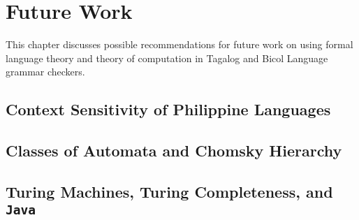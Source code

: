 \chapter{Future Work}

This chapter discusses possible recommendations for future work on using formal language theory and theory of computation in Tagalog and Bicol Language grammar checkers.

\section{Context Sensitivity of Philippine Languages}

\section{Classes of Automata and Chomsky Hierarchy}

\section{Turing Machines, Turing Completeness, and \texttt{Java}}